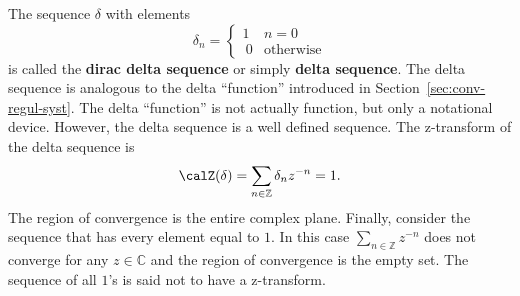 \documentclass[11pt,a4paper]{book}
\theoremstyle{plain}
\numberwithin{equation}{section}
\newcommand{\ints}{{\mathbb Z}}
\newcommand{\complex}{{\mathbb C}}
\newcommand{\term}{\textbf}
\begin{document}
The sequence $\delta$ with elements
\[
\delta_n = \begin{cases}
1 & n = 0 \\\
0 & \text{otherwise}
\end{cases}
\]  
is called the \term{dirac delta sequence} or simply \term{delta sequence}.  The delta sequence is analogous to the delta ``function'' introduced in Section~\ref{sec:conv-regul-syst}.  The delta ``function'' is not actually function, but only a notational device.  However, the delta sequence is a well defined sequence.  The z-transform of the delta sequence is
\[
\calZ(\delta) = \sum_{n \in \ints} \delta_n z^{-n} = 1.
\]
The region of convergence is the entire complex plane.  Finally, consider the sequence that has every element equal to $1$.  In this case $\sum_{n \in \ints} z^{-n}$ does not converge for any $z \in \complex$ and the region of convergence is the empty set.  The sequence of all $1$'s is said not to have a z-transform.
\end{document}
